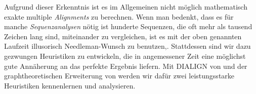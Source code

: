 Aufgrund dieser Erkenntnis ist es im Allgemeinen nicht möglich mathematisch exakte multiple \emph{Alignments} zu berechnen. Wenn man bedenkt, dass es für manche \emph{Sequenzanalysen} nötig ist hunderte Sequenzen, die oft mehr als tausend Zeichen lang sind, miteinander zu vergleichen, ist es mit der oben genannten Laufzeit illusorisch Needleman-Wunsch zu benutzen,. Stattdessen sind wir dazu gezwungen Heuristiken zu entwickeln, die in angemessener Zeit eine möglichst gute Annäherung an das perfekte Ergebnis liefern. Mit DIALIGN von \cite{mdw96} und der graphtheoretischen Erweiterung von \cite{cpm10} werden wir dafür zwei leistungsstarke Heuristiken kennenlernen und analysieren.










